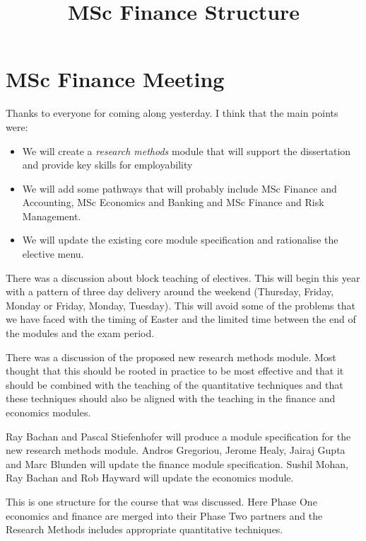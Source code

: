 \documentclass[9pt, a4paper, oneside]{article} %
\begin{document}
\title{MSc Finance Structure}
\section*{MSc Finance Meeting}

Thanks to everyone for coming along yesterday.  I think that the main points were:

\begin{itemize}
\item We will create a \emph{research methods} module that will support the dissertation and provide key skills for employability
\item We will add some pathways that will probably include MSc Finance and Accounting, MSc Economics and Banking and MSc Finance and Risk Management. 
\item We will update the existing core module specification and rationalise the elective menu.
\end{itemize}

There was a discussion about block teaching of electives. This will begin this year with a pattern of three day delivery around the weekend (Thursday, Friday, Monday or Friday, Monday, Tuesday).  This will avoid some of the problems that we have faced with the timing of Easter and the limited time between the end of the modules and the exam period. 

There was a discussion of the proposed new research methods module.  Most thought that this should be rooted in practice to be most effective and that it should be combined with the teaching of the quantitative techniques and that these techniques should also be aligned with the teaching in the finance and economics modules.  

Ray Bachan and Pascal Stiefenhofer will produce a module specification for the new research methods module.  Andros Gregoriou, Jerome Healy, Jairaj Gupta and Marc Blunden will update the finance module specification.  Sushil Mohan, Ray Bachan and Rob Hayward will update the economics module.  

This is one structure for the course that was discussed. Here Phase One economics and finance are merged into their Phase Two partners and the Research Methods includes appropriate quantitative techniques.  
\end{document}
